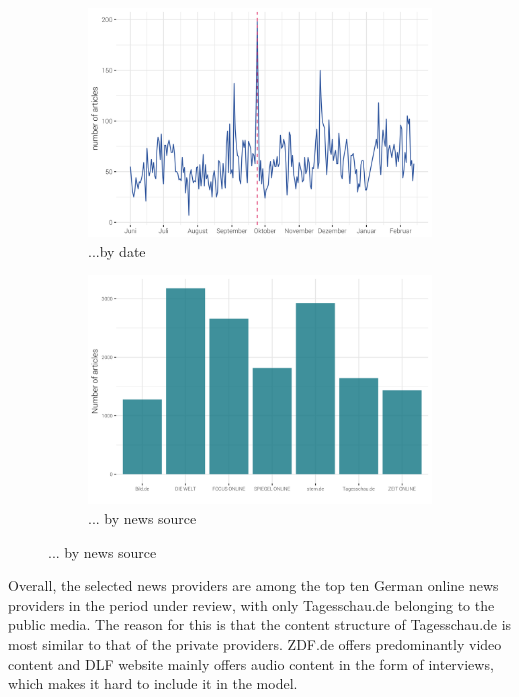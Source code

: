\documentclass[12pt,a4paper,notitlepage]{article}
\begin{document}
\begin{figure}[H]
	\caption{Article distribution...}
	\begin{center}
		\begin{subfigure}[normla]{0.49\textwidth}
			\includegraphics[width=\textwidth]{../figs/timeline.png}
			\caption{...by date}
			\label{fig_distr1}
		\end{subfigure}
		\begin{subfigure}[normla]{0.49\textwidth}
			\includegraphics[width=\textwidth]{../figs/bar.png}
			\caption{... by news source}
			\label{fig_distr2}
		\end{subfigure}
	\end{center}
\end{figure}

Overall, the selected news providers are among the top ten German online news providers in the period under review, with only Tagesschau.de belonging to the public media. The reason for this is that the content structure of Tagesschau.de is most similar to that of the private providers. ZDF.de offers predominantly video content and DLF website mainly offers audio content in the form of interviews, which makes it hard to include it in the model. 
\end{document}
